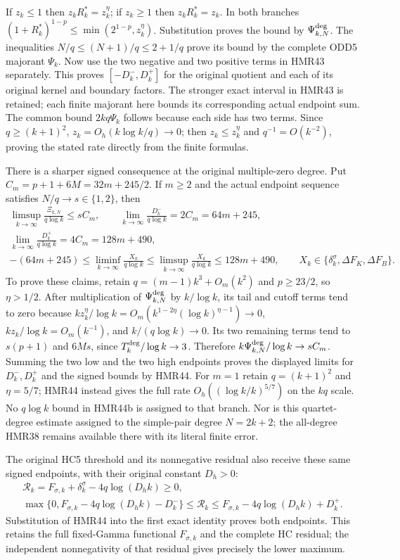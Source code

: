 \documentclass[11pt,a4paper]{article}
\begin{document}
If $z_k\leq1$ then $z_kR_k^*=z_k^\eta$; if $z_k\geq1$
then $z_kR_k^*=z_k$. In both branches
$(1+R_k^*)^{1-p}\leq\min(2^{1-p},z_k^\eta)$.
Substitution proves the bound by $\Psi_{k,N}^{\rm deg}$.
The inequalities $N/q\leq(N+1)/q\leq2+1/q$ prove its
bound by the complete ODD5 majorant $\Psi_k$.
Now use the two negative and two positive terms in HMR43
separately. This proves $[-D_k^-,D_k^+]$ for the original
quotient and each of its original kernel and boundary factors.
The stronger exact interval in HMR43 is retained; each finite
majorant here bounds its corresponding actual endpoint sum.
The common bound $2kq\Psi_k$ follows because each side has
two terms. Since $q\geq(k+1)^2$, $z_k=O_h(k\log k/q)\to0$;
then $z_k\leq z_k^\eta$ and $q^{-1}=O(k^{-2})$, proving
the stated rate directly from the finite formulas.

There is a sharper signed consequence at the original
multiple-zero degree. Put
$C_m=p+1+6M=32m+245/2$. If $m\geq2$ and the actual
endpoint sequence satisfies $N/q\to s\in\{1,2\}$, then
\[
\begin{gathered}
 \limsup_{k\to\infty}\frac{\Xi_{k,N}}{q\log k}
       \leq sC_m,\qquad
 \lim_{k\to\infty}\frac{D_k^-}{q\log k}=2C_m=64m+245,\\
 \lim_{k\to\infty}\frac{D_k^+}{q\log k}=4C_m=128m+490,\\
 -(64m+245)\leq\liminf_{k\to\infty}\frac{X_k}{q\log k}
 \leq\limsup_{k\to\infty}\frac{X_k}{q\log k}
 \leq128m+490,\qquad
 X_k\in\{\delta_k^\sigma,\Delta F_K,\Delta F_B\}.
\end{gathered}\tag{HMR44b}
\]
To prove these claims, retain $q=(m-1)k^3+O_m(k^2)$ and
$p\geq23/2$, so $\eta>1/2$.
After multiplication of $\Psi_{k,N}^{\rm deg}$ by
$k/\log k$, its tail and cutoff terms tend to zero because
$kz_k^\eta/\log k
=O_m(k^{1-2\eta}(\log k)^{\eta-1})\to0$,
$kz_k/\log k=O_m(k^{-1})$, and
$k/(q\log k)\to0$. Its two remaining terms tend to
$s(p+1)$ and $6Ms$, since $T_k^{\rm deg}/\log k\to3$.
Therefore $k\Psi_{k,N}^{\rm deg}/\log k\to sC_m$.
Summing the two low and the two high endpoints proves
the displayed limits for $D_k^-,D_k^+$ and the signed
bounds by HMR44. For $m=1$ retain $q=(k+1)^2$ and
$\eta=5/7$; HMR44 instead gives the full rate
$O_h((\log k/k)^{5/7})$ on the $kq$ scale.
No $q\log k$ bound in HMR44b is assigned to that branch.
Nor is this quartet-degree estimate assigned to the
simple-pair degree $N=2k+2$; the all-degree HMR38 remains
available there with its literal finite error.

The original HC5 threshold and its nonnegative residual
also receive these same signed endpoints, with their
original constant $D_h>0$:
\[
\begin{gathered}
 \mathcal R_k=F_{\sigma,k}+\delta_k^\sigma
                         -4q\log(D_hk)\geq0,\\
 \max\{0,F_{\sigma,k}-4q\log(D_hk)-D_k^-\}
 \leq\mathcal R_k
 \leq F_{\sigma,k}-4q\log(D_hk)+D_k^+.
\end{gathered}\tag{HMR44c}
\]
Substitution of HMR44 into the first exact identity proves
both endpoints. This retains the full fixed-Gamma functional
$F_{\sigma,k}$ and the complete HC residual; the independent
nonnegativity of that residual gives precisely the lower maximum.
\end{document}
